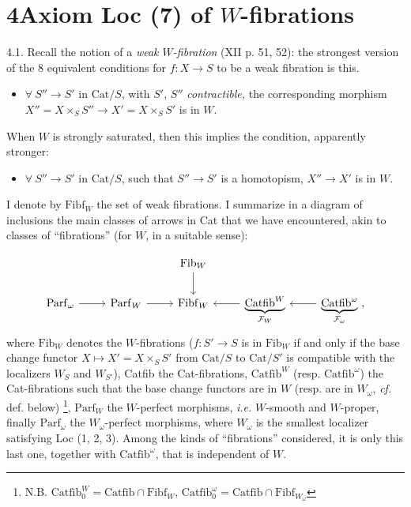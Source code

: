 \documentclass[11pt]{article}
\newcommand{\printedpage}[1]{\marginpar{\footnotesize p.~#1}}
\newcommand{\msp}[1]{\marginpar{\footnotesize [#1]}}
\newcommand{\Fib}{\mathrm{Fib}}
\newcommand{\Fibf}{\mathrm{Fibf}}
\newcommand{\Parf}{\mathrm{Parf}}
\newcommand{\Catfib}{\mathrm{Catfib}}
\newcommand{\Cat}{\mathrm{Cat}}
\begin{document}
\printedpage{19}

\section*{4\quad Axiom Loc (7) of $W$-fibrations}

4.1. Recall the notion of a \textit{weak $W$-fibration} (XII p. 51, 52): the strongest version of the 8 equivalent conditions for $f : X \longrightarrow S$ to be a weak fibration is this.

\begin{itemize}[leftmargin=2cm]
\item[\textbf{(Ff)}] $\forall\ S'' \longrightarrow S'$ in $\Cat/S$, with $S'$, $S''$ \textit{contractible,} the corresponding morphism $X'' = X \times_S S'' \longrightarrow X' = X \times_S S'$ is in $W$.
\end{itemize}

When $W$ is strongly saturated, then this implies the condition, apparently stronger:

\begin{itemize}[leftmargin=2cm]
\item[\textbf{(Ff$'$)}] $\forall\ S'' \longrightarrow S'$ in $\Cat/S$, such that $S'' \longrightarrow S'$ is a homotopism, $X'' \longrightarrow X'$ is in $W$.
\end{itemize}

I denote by $\Fibf_W$ the set of weak fibrations. I summarize in a diagram of inclusions the main classes of arrows in Cat that we have encountered, akin to classes of ``fibrations'' (for $W$, in a suitable sense):

\msp{page 28}

\[
\begin{tikzcd}
 & & \Fib_W \arrow[d] & & \\
\Parf_\omega \arrow[r] & \Parf_W \arrow[r] & \Fibf_W & \underbrace{\Catfib^W}_{\mathcal{F}_W} \arrow[l] & \underbrace{\Catfib^\omega}_{\mathcal{F}_\omega} \arrow[l] \ ,
\end{tikzcd}
\]
where $\Fib_W$ denotes the $W$-fibrations ($f : S' \longrightarrow S$ is in $\Fib_W$ if and only if the base change functor $X \longmapsto X' = X \times_S S'$ from $\Cat/S$ to $\Cat/S'$ is compatible with the localizers $W_S$ and $W_{S'}$), Catfib the Cat-fibrations, $\Catfib^W$ (resp. $\Catfib^\omega$) the Cat-fibrations such that the base change functors are in $W$ (resp. are in $W_\omega$, \textit{cf.} def. below) \footnote[20]{N.B. $\Catfib_0^W = \Catfib \cap \Fibf_W$, $\Catfib_0^\omega = \Catfib \cap \Fibf_{W_\omega}$}, $\Parf_W$ the $W$-perfect morphisms, \textit{i.e.} $W$-smooth and $W$-proper, finally $\Parf_\omega$ the $W_\omega$-perfect morphisms, where $W_\omega$ is the smallest localizer satisfying Loc (1, 2, 3). Among the kinds of ``fibrations'' considered, it is only this last one, together with $\Catfib^\omega$, that is independent of $W$.
\end{document}
